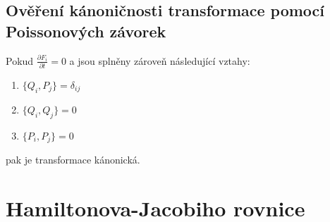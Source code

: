 \documentclass[a5paper,12pt]{article}
\begin{document}
\subsection{Ověření kánoničnosti transformace pomocí Poissonových závorek}
Pokud $\frac{\partial F_i}{\partial t} = 0$ a jsou splněny zároveň následující vztahy:
\begin{enumerate}
	\item $\{Q_i, P_j\} = \delta_{ij}$
	\item $\{Q_i, Q_j\} = 0$
	\item $\{P_i, P_j\} = 0$
\end{enumerate}

\noindent pak je transformace kánonická.

\newpage

\section{Hamiltonova-Jacobiho rovnice}
\end{document}

